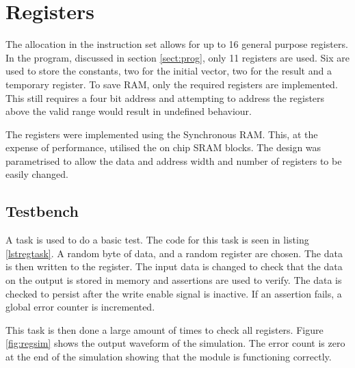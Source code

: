 
\section{Registers}\label{sect:regs}

The allocation in the instruction set allows for up to 16 general purpose registers. 
In the program, discussed in section \ref{sect:prog}, only 11 registers are used. 
Six are used to store the constants, two for the initial vector, two for the result and a temporary register.
To save RAM, only the required registers are implemented.
This still requires a four bit address and attempting to address the registers above the valid range would result in undefined behaviour.

The registers were implemented using the Synchronous RAM.
This, at the expense of performance, utilised the on chip SRAM blocks. 
The design was parametrised to allow the data and address width and number of registers to be easily changed. 


\subsection{Testbench}

A task is used to do a basic test.
The code for this task is seen in listing \ref{lstregtask}.
A random byte of data, and a random register are chosen. 
The data is then written to the register. 
The input data is changed to check that the data on the output is stored in memory and assertions are used to verify. 
The data is checked to persist after the write enable signal is inactive. 
If an assertion fails, a global error counter is incremented.

This task is then done a large amount of times to check all registers. 
Figure \ref{fig:regsim} shows the output waveform of the simulation. 
The error count is zero at the end of the simulation showing that the module is functioning correctly.






